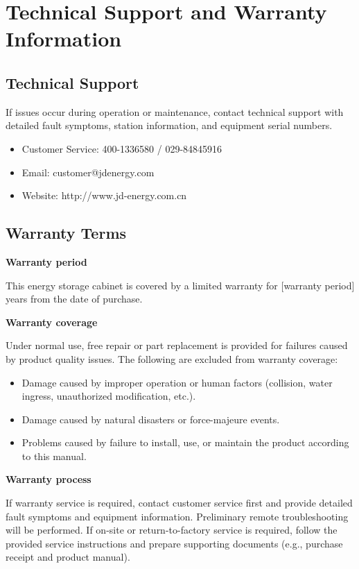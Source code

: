 \documentclass[11pt, a4paper]{article}
\begin{document}
\clearpage
\section{Technical Support and Warranty Information}

\subsection{Technical Support}
If issues occur during operation or maintenance, contact technical support with detailed fault symptoms, station information, and equipment serial numbers.
\begin{itemize}[leftmargin=1.5em]
    \item Customer Service: 400-1336580 / 029-84845916
    \item Email: customer@jdenergy.com
    \item Website: http://www.jd-energy.com.cn
\end{itemize}

\subsection{Warranty Terms}
\textbf{Warranty period}

This energy storage cabinet is covered by a limited warranty for [warranty period] years from the date of purchase.

\textbf{Warranty coverage}

Under normal use, free repair or part replacement is provided for failures caused by product quality issues. The following are excluded from warranty coverage:
\begin{itemize}[leftmargin=1.5em]
    \item Damage caused by improper operation or human factors (collision, water ingress, unauthorized modification, etc.).
    \item Damage caused by natural disasters or force-majeure events.
    \item Problems caused by failure to install, use, or maintain the product according to this manual.
\end{itemize}

\textbf{Warranty process}

If warranty service is required, contact customer service first and provide detailed fault symptoms and equipment information. Preliminary remote troubleshooting will be performed. If on-site or return-to-factory service is required, follow the provided service instructions and prepare supporting documents (e.g., purchase receipt and product manual).
\end{document}
